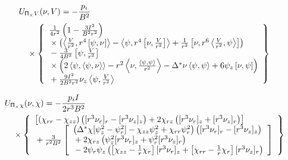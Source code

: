 \documentclass[letterpaper]{book}
\newcommand{\tensor}[1]{\mathsf{#1}}
\renewcommand{\P}{\tensor{\Pi}}
\newcommand{\gs}[1]{\Delta^* #1}
\newcommand{\pb}[2]{\left[#1,#2\right]}
\newcommand{\ip}[2]{\left\langle  #1,#2\right\rangle}
\begin{document}
\begin{eqnarray*}
  & \lefteqn{U_{\P_\times V}(\nu, V) = -\frac{p_i}{B^2}} &
  \\ && \mbox{} \times
  \left\{ \begin{array}{l}
      \frac{1}{4 r^2} \left(1 - \frac{3 I^2}{B^2 r^2} \right) 
      \\ \mbox{} \times
      \left( \ip{\frac{V}{r^2}}{r^4 \pb{\psi}{\nu}}
            -\ip{\psi}{r^4\pb{\nu}{\frac{V}{r^2}}}
	    +\frac{1}{r^2}\pb{\nu}{r^6\ip{\frac{V}{r^2}}{\psi}} \right)
      \\ \mbox{}
      -\frac{3}{4 B^2} \pb{\psi}{\frac{V}{r^2}}
      \\ \mbox{} \times
      \left( 2 \ip{\psi}{\ip{\psi}{\nu}}
           - r^2 \ip{\nu}{\frac{\ip{\psi}{\psi}}{r^2}}
	   - \gs{\nu} \ip{\psi}{\psi}
	   + 6 \psi_z \pb{\nu}{\psi} \right)
      \\ \mbox{}
      +\frac{9 I^2}{2 B^2 r^2} \nu_z \ip{\psi}{\frac{V}{r^2}}
    \end{array} \right\}
\end{eqnarray*}

\begin{eqnarray*}
  & \lefteqn{U_{\P_\times \chi}(\nu, \chi) = -\frac{p_i I}{2 r^3 B^2}} &
  \\ && \mbox{} \times 
  \left\{ \begin{array}{l}
    \left[ \left( \chi_{r r} - \chi_{z z} \right)
           \left( [r^3 \nu_r]_r - [r^3 \nu_z]_z \right)
       +   2 \chi_{r z} 
           \left( [r^3 \nu_r]_z + [r^3 \nu_z]_r \right)
           \right]
    \\ \mbox{}
    + \frac{3}{r^2 B^2} \left[ \begin{array}{l} 
	\left( \gs{\chi}[\psi_z^2 - \psi_r^2] 
        - \chi_{z z} \psi_z^2 + \chi_{r r} \psi_r^2 \right)
	\left( [r^3 \nu_r]_r - [r^3 \nu_z]_z \right)
	\\ \mbox{} + 2 \chi_{r z} 
	\left( \psi_z^2 [r^3 \nu_r]_z
	      +\psi_r^2 [r^3 \nu_z]_r \right)
	\\ \mbox{} - 2 \psi_r \psi_z 
	\left( \left[\chi_{z z} - \frac{1}{r}\chi_r \right] [r^3 \nu_r]_z
	      +\left[\chi_{r r} - \frac{1}{r}\chi_r \right][r^3 \nu_z]_r 
	      \right)
      \end{array} \right]
  \end{array} \right\}
\end{eqnarray*}
\end{document}

